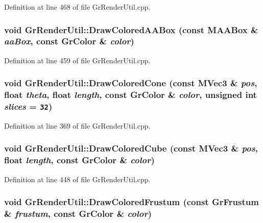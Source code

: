 Definition at line 468 of file GrRenderUtil.cpp.\hypertarget{class_gr_render_util_8c4e206af04748afd131741ef7be632c}{
\subsubsection[{DrawColoredAABox}]{\setlength{\rightskip}{0pt plus 5cm}void GrRenderUtil::DrawColoredAABox (const {\bf MAABox} \& {\em aaBox}, \/  const {\bf GrColor} \& {\em color})}}
\label{class_gr_render_util_8c4e206af04748afd131741ef7be632c}




Definition at line 459 of file GrRenderUtil.cpp.\hypertarget{class_gr_render_util_f53586276257c886ea2d3c526db1d233}{
\subsubsection[{DrawColoredCone}]{\setlength{\rightskip}{0pt plus 5cm}void GrRenderUtil::DrawColoredCone (const {\bf MVec3} \& {\em pos}, \/  float {\em theta}, \/  float {\em length}, \/  const {\bf GrColor} \& {\em color}, \/  unsigned int {\em slices} = {\tt 32})}}
\label{class_gr_render_util_f53586276257c886ea2d3c526db1d233}




Definition at line 369 of file GrRenderUtil.cpp.\hypertarget{class_gr_render_util_754e864fcf78c7f20fa4a417475960cc}{
\subsubsection[{DrawColoredCube}]{\setlength{\rightskip}{0pt plus 5cm}void GrRenderUtil::DrawColoredCube (const {\bf MVec3} \& {\em pos}, \/  float {\em length}, \/  const {\bf GrColor} \& {\em color})}}
\label{class_gr_render_util_754e864fcf78c7f20fa4a417475960cc}




Definition at line 448 of file GrRenderUtil.cpp.\hypertarget{class_gr_render_util_ed7cf8334d73eb87da59905af527b2bb}{
\subsubsection[{DrawColoredFrustum}]{\setlength{\rightskip}{0pt plus 5cm}void GrRenderUtil::DrawColoredFrustum (const {\bf GrFrustum} \& {\em frustum}, \/  const {\bf GrColor} \& {\em color})}}
\label{class_gr_render_util_ed7cf8334d73eb87da59905af527b2bb}




